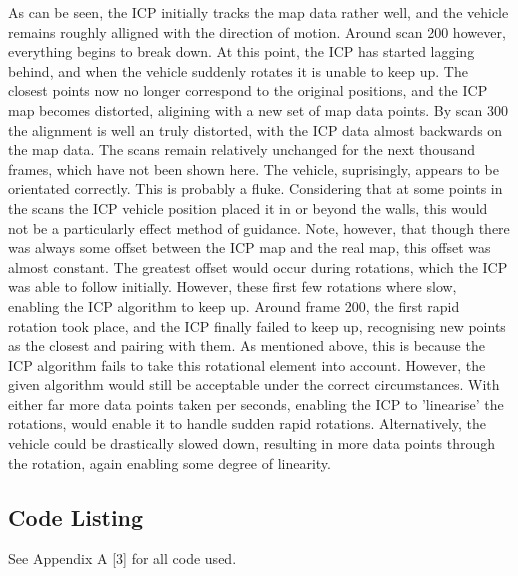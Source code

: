 		\newline
		\newline
		\pagebreak
		As can be seen, the ICP initially tracks the map data rather well, and the vehicle remains roughly alligned with the direction of motion. Around scan 200 however, everything begins to break down. At this point, the ICP has started lagging behind, and when the vehicle suddenly rotates it is unable to keep up. The closest points now no longer correspond to the original positions, and the ICP map becomes distorted, aligining with a new set of map data points. By scan 300 the alignment is well an truly distorted, with the ICP data almost backwards on the map data. The scans remain relatively unchanged for the next thousand frames, which have not been shown here. The vehicle, suprisingly, appears to be orientated correctly. This is probably a fluke.\newline \newline
		Considering that at some points in the scans the ICP vehicle position placed it in or beyond the walls, this would not be a particularly effect method of guidance.\newline \newline
		Note, however, that though there was always some offset between the ICP map and the real map, this offset was almost constant. The greatest offset would occur during rotations, which the ICP was able to follow initially. However, these first few rotations where slow, enabling the ICP algorithm to keep up. Around frame 200, the first rapid rotation took place, and the ICP finally failed to keep up, recognising new points as the closest and pairing with them.\newline
		As mentioned above, this is because the ICP algorithm fails to take this rotational element into account. However, the given algorithm would still be acceptable under the correct circumstances. With either far more data points taken per seconds, enabling the ICP to 'linearise' the rotations, would enable it to handle sudden rapid rotations. Alternatively, the vehicle could be drastically slowed down, resulting in more data points through the rotation, again enabling some degree of linearity.
		\newline
		

		
	\pagebreak

	\subsection*{Code Listing}
	See Appendix A [3] for all code used.
